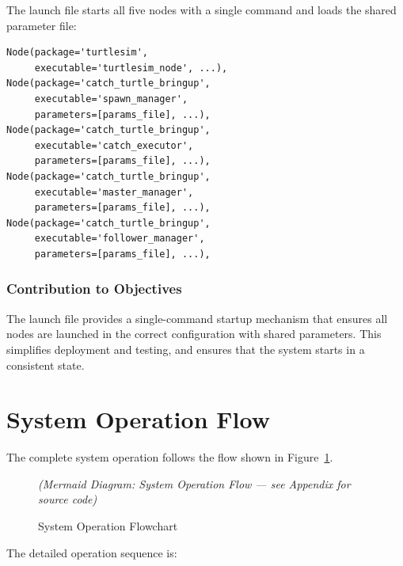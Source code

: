 \documentclass[12pt,a4paper]{article}
\begin{document}
The launch file starts all five nodes with a single command and loads the shared parameter file:

\begin{lstlisting}[title={catch\_turtle.launch.py (simplified)}]
Node(package='turtlesim',
     executable='turtlesim_node', ...),
Node(package='catch_turtle_bringup',
     executable='spawn_manager',
     parameters=[params_file], ...),
Node(package='catch_turtle_bringup',
     executable='catch_executor',
     parameters=[params_file], ...),
Node(package='catch_turtle_bringup',
     executable='master_manager',
     parameters=[params_file], ...),
Node(package='catch_turtle_bringup',
     executable='follower_manager',
     parameters=[params_file], ...),
\end{lstlisting}

\subsubsection{Contribution to Objectives}

The launch file provides a single-command startup mechanism that ensures all nodes are launched in the correct configuration with shared parameters. This simplifies deployment and testing, and ensures that the system starts in a consistent state.

\section{System Operation Flow}
\label{sec:flow}

The complete system operation follows the flow shown in Figure~\ref{fig:flow}.

\begin{figure}[H]
  \centering
  \caption{System Operation Flowchart}
  \label{fig:flow}
  \vspace{0.5em}
  \textit{(Mermaid Diagram: System Operation Flow --- see Appendix for source code)}
\end{figure}

The detailed operation sequence is:
\end{document}
